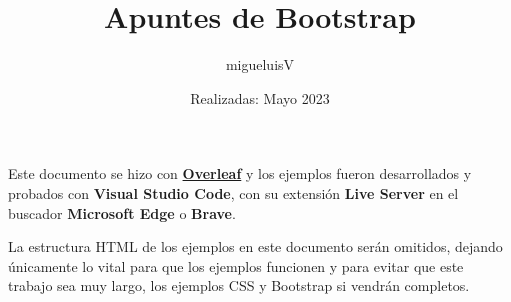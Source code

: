 \documentclass[12pt]{article}
\title{Apuntes de Bootstrap}
\author{migueluisV}
\date{Realizadas: Mayo 2023}
\begin{document}
\renewcommand*\contentsname{Índice}
\renewcommand{\listtablename}{Índice de Tablas}
\renewcommand{\listfigurename}{Índice de Figuras}

\maketitle\newpage
\tableofcontents\newpage
\listoffigures\newpage
\listoftables\newpage

\hspace{0.55cm}Este documento se hizo con \href{https://es.overleaf.com/}{\textbf{Overleaf}} y los ejemplos fueron desarrollados y probados con \textbf{Visual Studio Code}, con su extensión \textbf{Live Server} en el buscador \textbf{Microsoft Edge} o \textbf{Brave}.

\sloppy La estructura HTML de los ejemplos en este documento serán omitidos, dejando únicamente lo vital para que los ejemplos funcionen y para evitar que este trabajo sea muy largo, los ejemplos CSS y Bootstrap si vendrán completos.



\end{document}
